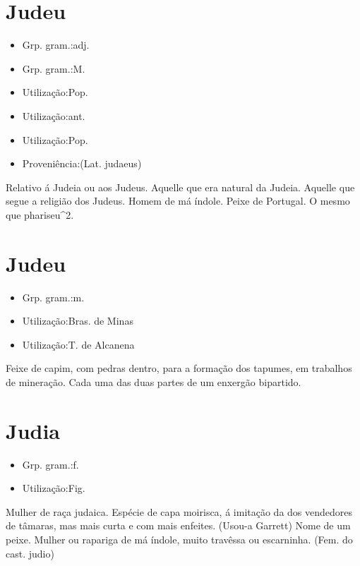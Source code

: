 \documentclass{article}
\begin{document}
\section{Judeu}
\begin{itemize}
\item {Grp. gram.:adj.}
\end{itemize}
\begin{itemize}
\item {Grp. gram.:M.}
\end{itemize}
\begin{itemize}
\item {Utilização:Pop.}
\end{itemize}
\begin{itemize}
\item {Utilização:ant.}
\end{itemize}
\begin{itemize}
\item {Utilização:Pop.}
\end{itemize}
\begin{itemize}
\item {Proveniência:(Lat. \textunderscore judaeus\textunderscore )}
\end{itemize}
Relativo á Judeia ou aos Judeus.
Aquelle que era natural da Judeia.
Aquelle que segue a religião dos Judeus.
Homem de má índole.
Peixe de Portugal.
O mesmo que \textunderscore phariseu\textunderscore ^2.
\section{Judeu}
\begin{itemize}
\item {Grp. gram.:m.}
\end{itemize}
\begin{itemize}
\item {Utilização:Bras. de Minas}
\end{itemize}
\begin{itemize}
\item {Utilização:T. de Alcanena}
\end{itemize}
Feixe de capim, com pedras dentro, para a formação dos tapumes, em trabalhos de mineração.
Cada uma das duas partes de um enxergão bipartido.
\section{Judia}
\begin{itemize}
\item {Grp. gram.:f.}
\end{itemize}
\begin{itemize}
\item {Utilização:Fig.}
\end{itemize}
Mulher de raça judaica.
Espécie de capa moirisca, á imitação da dos vendedores de tâmaras, mas mais curta e com mais enfeites. (Usou-a Garrett)
Nome de um peixe.
Mulher ou rapariga de má índole, muito travêssa ou escarninha.
(Fem. do cast. \textunderscore judio\textunderscore )
\end{document}
